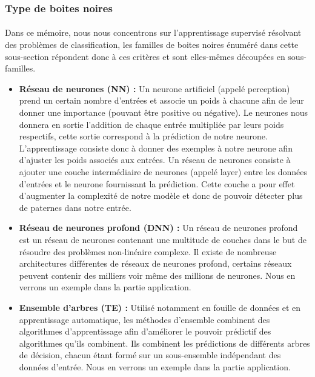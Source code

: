 \subsubsection{Type de boites noires}
\paragraph{}Dans ce mémoire, nous nous concentrons sur l'apprentissage supervisé résolvant des problèmes de classification, les familles de boites noires énuméré dans cette sous-section répondent donc à ces critères et sont elles-mêmes découpées en sous-familles.
\begin{itemize}
    \item \textbf{Réseau de neurones (NN) :} Un neurone artificiel (appelé perception) prend un certain nombre d'entrées et associe un poids à chacune afin de leur donner une importance (pouvant être positive ou négative). Le neurones nous donnera en sortie l'addition de chaque entrée multipliée par leurs poids respectifs, cette sortie correspond à la prédiction de notre neurone. L'apprentissage consiste donc à donner des exemples à notre neurone afin d'ajuster les poids associés aux entrées. Un réseau de neurones consiste à ajouter une couche intermédiaire de neurones (appelé layer) entre les données d'entrées et le neurone fournissant la prédiction. Cette couche a pour effet d'augmenter la complexité de notre modèle et donc de pouvoir détecter plus de paternes dans notre entrée.
    
    \item \textbf{Réseau de neurones profond (DNN) :} Un réseau de neurones profond est un réseau de neurones contenant une multitude de couches dans le but de résoudre des problèmes non-linéaire complexe. Il existe de nombreuse architectures différentes de réseaux de neurones profond, certains réseaux peuvent contenir des milliers voir même des millions de neurones. Nous en verrons un exemple dans la partie application.
    
    \item \textbf{Ensemble d'arbres (TE) :} Utilisé notamment en fouille de données et en apprentissage automatique, les méthodes d'ensemble combinent des algorithmes d'apprentissage afin d'améliorer le pouvoir prédictif des algorithmes qu'ils combinent. Ils combinent les prédictions de différents arbres de décision, chacun étant formé sur un sous-ensemble indépendant des données d'entrée. Nous en verrons un exemple dans la partie application.
    

\end{itemize}
